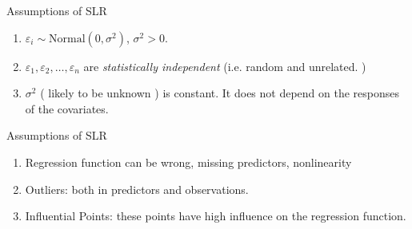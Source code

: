 \documentclass[compress]{beamer}
\begin{document}


\begin{frame}{Assumptions of SLR }



\begin{enumerate}
\item $\varepsilon_i\sim \text{Normal}(0, \sigma^2)$, $\sigma^2>0$.
\item $\varepsilon_1, \varepsilon_2, \ldots, \varepsilon_n$ are {\it statistically  independent} (i.e.  random and unrelated. )
\item $\sigma^2$  ( likely to be unknown ) is constant. It does not depend on the responses of the covariates. 
\end{enumerate}

\end{frame}





\begin{frame}{Assumptions of SLR }

\begin{enumerate}
\item Regression function can be wrong, missing predictors,
nonlinearity
\item Outliers: both in predictors and observations.
\item Influential Points: these points have high  influence on the
regression function.
\end{enumerate}



\end{frame}





\end{document}
